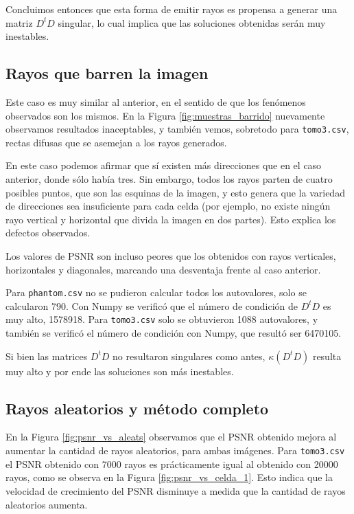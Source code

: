 \documentclass[a4paper]{article}
\begin{document}
Concluimos entonces que esta forma de emitir rayos es propensa a generar una matriz $D^tD$ singular, lo cual implica que las soluciones obtenidas 
serán muy inestables.

\subsection{Rayos que barren la imagen}

Este caso es muy similar al anterior, en el sentido de que los fenómenos observados son los mismos. En la Figura \ref{fig:muestras_barrido} 
nuevamente observamos resultados inaceptables, y también vemos, sobretodo para \texttt{tomo3.csv}, rectas difusas que se asemejan a los rayos 
generados.

En este caso podemos afirmar que sí existen más direcciones que en el caso anterior, donde sólo había tres. Sin embargo, todos los rayos parten de 
cuatro posibles puntos, que son las esquinas de la imagen, y esto genera que la variedad de direcciones sea insuficiente para cada 
celda (por ejemplo, no existe ningún rayo vertical y horizontal que divida la imagen en dos partes). Esto explica los defectos observados.

Los valores de PSNR son incluso peores que los obtenidos con rayos verticales, horizontales y diagonales, marcando una desventaja frente al caso 
anterior.

Para \texttt{phantom.csv} no se pudieron calcular todos los autovalores, solo se calcularon 790. Con Numpy se verificó que el número de condición 
de $D^tD$ es muy alto, 1578918. Para \texttt{tomo3.csv} solo se obtuvieron 1088 autovalores, y también se verificó el número de condición con Numpy, 
que resultó ser 6470105.

Si bien las matrices $D^tD$ no resultaron singulares como antes, $\kappa(D^tD)$ resulta muy alto y por ende las soluciones son más inestables.

\subsection{Rayos aleatorios y método completo}

En la Figura \ref{fig:psnr_vs_aleats} observamos que el PSNR obtenido mejora al aumentar la cantidad de rayos aleatorios, para ambas imágenes. Para 
\texttt{tomo3.csv} el PSNR obtenido con 7000 rayos es prácticamente igual al obtenido con 20000 rayos, como se observa en la Figura 
\ref{fig:psnr_vs_celda_1}. Esto indica que la velocidad de crecimiento del PSNR disminuye a medida que la cantidad de rayos aleatorios aumenta.
\end{document}

